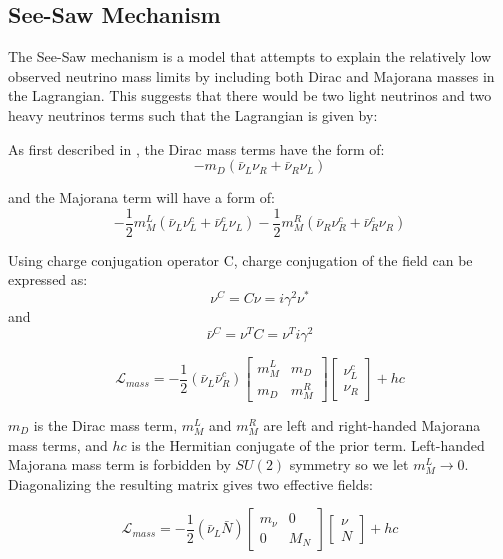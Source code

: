 \subsection{See-Saw Mechanism}
The See-Saw mechanism is a model that attempts to explain the relatively low observed neutrino mass limits by including both Dirac and Majorana masses in the Lagrangian. This suggests that there would be two light neutrinos and two heavy neutrinos terms such that the Lagrangian is given by:


As first described in \cite{see-saw_article}, the Dirac mass terms have the form of:
\begin{equation}\label{dirac_mass_terms}
-m_D(\bar{\nu}_L\nu_R+\bar{\nu}_R\nu_L)
\end{equation}

and the Majorana term will have a form of:
\begin{equation}\label{majorana_mass_terms}
-\frac{1}{2}m^L_M(\bar{\nu}_L\nu_L^c+\bar{\nu}_L^c\nu_L)-\frac{1}{2}m^R_M(\bar{\nu}_R\nu_R^c+\bar{\nu}_R^c\nu_R)
\end{equation}

Using charge conjugation operator C, charge conjugation of the field can be expressed as:
\begin{equation}\label{charge_conjugation1}
\nu^C=C\nu=i\gamma^2\nu^*
\end{equation}
and
\begin{equation}\label{charge_conjugation2}
\bar{\nu}^C=\nu^TC=\nu^Ti\gamma^2
\end{equation}

\begin{equation}\label{mass_lagrangian}
\mathcal{L}_{mass} = -\frac{1}{2}(\bar{\nu}_L\bar{\nu}_R^c) \begin{bmatrix} m_M^L & m_D \\ m_D & m_M^R \end{bmatrix} \begin{bmatrix} \nu_L^c \\ \nu_R \end{bmatrix} + hc
\end{equation}

$m_D$ is the Dirac mass term, $m_M^L$ and $m_M^R$ are left and right-handed Majorana mass terms, and $hc$ is the Hermitian conjugate of the prior term. Left-handed Majorana mass term is forbidden by $SU (2)$ symmetry so we let $m_M^L \rightarrow 0$. Diagonalizing the resulting matrix gives two effective fields: 

\begin{equation}\label{mass_lagrangian_reduced}
\mathcal{L}_{mass} = -\frac{1}{2}(\bar{\nu}_L\bar{N}) \begin{bmatrix} m_\nu & 0 \\ 0 & M_N \end{bmatrix} \begin{bmatrix} \nu \\ N \end{bmatrix} + hc
\end{equation}

